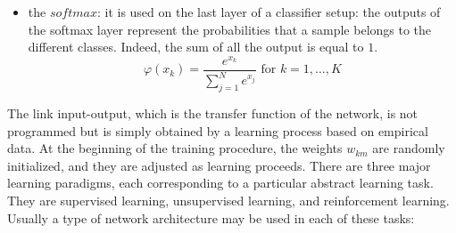 \begin{itemize}
\item the $softmax$: it is used on the last layer of a classifier setup: the outputs of the softmax layer represent the probabilities that a sample belongs to the different classes. Indeed, the sum of all the output is equal to $1$.
\begin{equation}
\varphi(x_k) = \frac{e^{x_k}}{\sum_{j=1}^{N}e^{x_j}} \text{ for }  k=1,\dots,K
\end{equation}
\end{itemize}

The link input-output, which is the transfer function of the network, is not programmed but is simply obtained by a learning process based on empirical data. At the beginning of the training procedure, the weights ${ w }_{ km }$ are randomly initialized, and they are adjusted as learning proceeds. 
There are three major learning paradigms, each corresponding to a particular abstract learning task.
They are supervised learning, unsupervised learning, and reinforcement learning. Usually a type of
network architecture may be used in each of these tasks:

